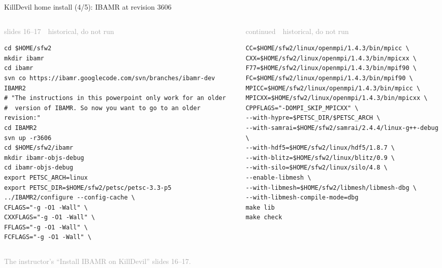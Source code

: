 \documentclass[aspectratio=169,11pt]{beamer}
\newcommand{\sourcecredit}[1]{\vfill\begin{flushright}\tiny\textcolor{DarkGray}{#1}\end{flushright}}
\newcommand{\hist}[1]{{\tiny\sffamily\textcolor{DarkGray}{#1\ \textbullet\ historical, do not run}}\par\nointerlineskip\vspace{0.3mm}}
\begin{document}
\begin{frame}[fragile]{KillDevil home install (4/5): IBAMR  at revision 3606}
\label{fr:kd4}
\begin{columns}[T,onlytextwidth]
\begin{column}{0.48\textwidth}
\hist{slides 16--17}
\begin{lstlisting}[style=hist]
cd $HOME/sfw2
mkdir ibamr
cd ibamr
svn co https://ibamr.googlecode.com/svn/branches/ibamr-dev IBAMR2
# "The instructions in this powerpoint only work for an older
#  version of IBAMR. So now you want to go to an older revision:"
cd IBAMR2
svn up -r3606
cd $HOME/sfw2/ibamr
mkdir ibamr-objs-debug
cd ibamr-objs-debug
export PETSC_ARCH=linux
export PETSC_DIR=$HOME/sfw2/petsc/petsc-3.3-p5
../IBAMR2/configure --config-cache \
CFLAGS="-g -O1 -Wall" \
CXXFLAGS="-g -O1 -Wall" \
FFLAGS="-g -O1 -Wall" \
FCFLAGS="-g -O1 -Wall" \
\end{lstlisting}
\end{column}
\begin{column}{0.49\textwidth}
\hist{continued}
\begin{lstlisting}[style=hist]
CC=$HOME/sfw2/linux/openmpi/1.4.3/bin/mpicc \
CXX=$HOME/sfw2/linux/openmpi/1.4.3/bin/mpicxx \
F77=$HOME/sfw2/linux/openmpi/1.4.3/bin/mpif90 \
FC=$HOME/sfw2/linux/openmpi/1.4.3/bin/mpif90 \
MPICC=$HOME/sfw2/linux/openmpi/1.4.3/bin/mpicc \
MPICXX=$HOME/sfw2/linux/openmpi/1.4.3/bin/mpicxx \
CPPFLAGS="-DOMPI_SKIP_MPICXX" \
--with-hypre=$PETSC_DIR/$PETSC_ARCH \
--with-samrai=$HOME/sfw2/samrai/2.4.4/linux-g++-debug \
--with-hdf5=$HOME/sfw2/linux/hdf5/1.8.7 \
--with-blitz=$HOME/sfw2/linux/blitz/0.9 \
--with-silo=$HOME/sfw2/linux/silo/4.8 \
--enable-libmesh \
--with-libmesh=$HOME/sfw2/libmesh/libmesh-dbg \
--with-libmesh-compile-mode=dbg
make lib
make check
\end{lstlisting}
\end{column}
\end{columns}
\sourcecredit{The instructor's ``Install IBAMR on KillDevil'' slides 16--17.}
\end{frame}
\end{document}
